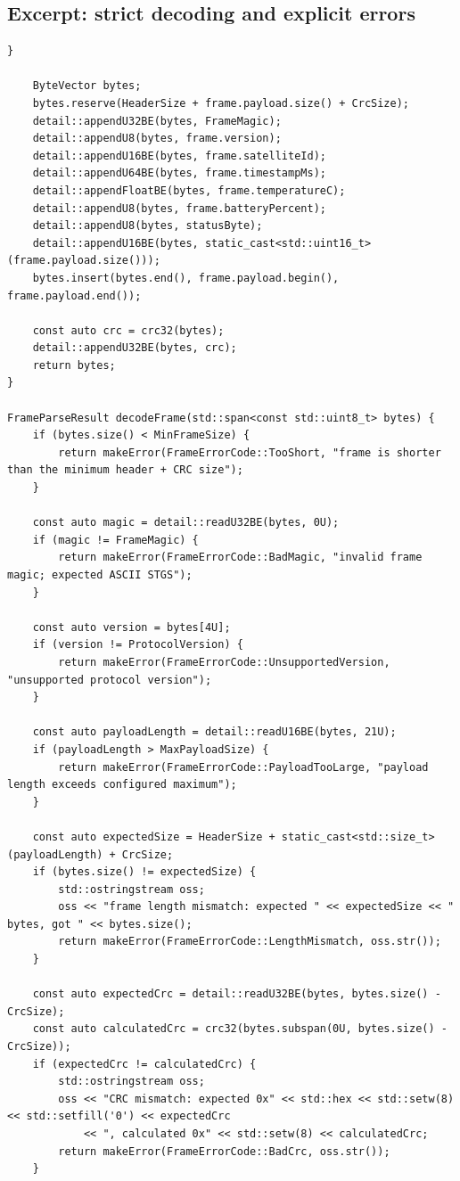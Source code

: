 \documentclass[10pt,a4paper]{article}
\begin{document}
\subsection{Excerpt: strict decoding and explicit errors}
\begin{lstlisting}[caption={Strict decoding and domain errors}]
    }

    ByteVector bytes;
    bytes.reserve(HeaderSize + frame.payload.size() + CrcSize);
    detail::appendU32BE(bytes, FrameMagic);
    detail::appendU8(bytes, frame.version);
    detail::appendU16BE(bytes, frame.satelliteId);
    detail::appendU64BE(bytes, frame.timestampMs);
    detail::appendFloatBE(bytes, frame.temperatureC);
    detail::appendU8(bytes, frame.batteryPercent);
    detail::appendU8(bytes, statusByte);
    detail::appendU16BE(bytes, static_cast<std::uint16_t>(frame.payload.size()));
    bytes.insert(bytes.end(), frame.payload.begin(), frame.payload.end());

    const auto crc = crc32(bytes);
    detail::appendU32BE(bytes, crc);
    return bytes;
}

FrameParseResult decodeFrame(std::span<const std::uint8_t> bytes) {
    if (bytes.size() < MinFrameSize) {
        return makeError(FrameErrorCode::TooShort, "frame is shorter than the minimum header + CRC size");
    }

    const auto magic = detail::readU32BE(bytes, 0U);
    if (magic != FrameMagic) {
        return makeError(FrameErrorCode::BadMagic, "invalid frame magic; expected ASCII STGS");
    }

    const auto version = bytes[4U];
    if (version != ProtocolVersion) {
        return makeError(FrameErrorCode::UnsupportedVersion, "unsupported protocol version");
    }

    const auto payloadLength = detail::readU16BE(bytes, 21U);
    if (payloadLength > MaxPayloadSize) {
        return makeError(FrameErrorCode::PayloadTooLarge, "payload length exceeds configured maximum");
    }

    const auto expectedSize = HeaderSize + static_cast<std::size_t>(payloadLength) + CrcSize;
    if (bytes.size() != expectedSize) {
        std::ostringstream oss;
        oss << "frame length mismatch: expected " << expectedSize << " bytes, got " << bytes.size();
        return makeError(FrameErrorCode::LengthMismatch, oss.str());
    }

    const auto expectedCrc = detail::readU32BE(bytes, bytes.size() - CrcSize);
    const auto calculatedCrc = crc32(bytes.subspan(0U, bytes.size() - CrcSize));
    if (expectedCrc != calculatedCrc) {
        std::ostringstream oss;
        oss << "CRC mismatch: expected 0x" << std::hex << std::setw(8) << std::setfill('0') << expectedCrc
            << ", calculated 0x" << std::setw(8) << calculatedCrc;
        return makeError(FrameErrorCode::BadCrc, oss.str());
    }


\end{lstlisting}
\end{document}
